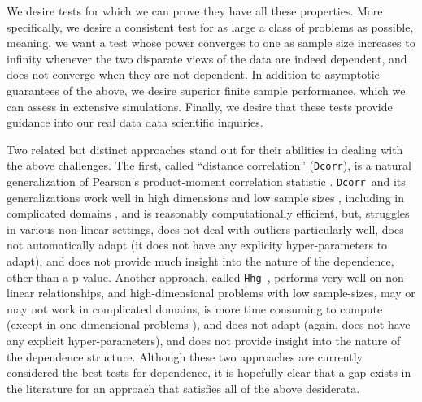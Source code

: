 \documentclass[11pt]{article}
\providecommand{\sct}[1]{{\sc \texttt{#1}}}
\newcommand{\Hhg}{\sct{Hhg}}
\newcommand{\Dcorr}{\sct{Dcorr}}
\begin{document}
We desire tests for which we can prove they have all these properties. More specifically, we desire a consistent test for as large a class of problems as possible, meaning, we want a test whose power converges to one as sample size increases to infinity whenever the two disparate views of the data are indeed dependent, and does not converge when they are not dependent. 
In addition to asymptotic guarantees of the above, we desire superior finite sample performance, which we can assess in extensive simulations.  Finally, we desire that these tests provide guidance into our real data data scientific inquiries.




Two related but distinct approaches stand out for their abilities in dealing with the above challenges. The first, called ``distance correlation'' (\Dcorr), is a natural generalization of Pearson's product-moment correlation statistic \cite{RizzoSzekely2016}.  \Dcorr~and its generalizations work well in high dimensions and low sample sizes \cite{??}, including in complicated domains \cite{Lyons2013}, and is reasonably computationally efficient, but, struggles in various non-linear settings, does not deal with outliers particularly well, does not automatically adapt (it does not have any explicity hyper-parameters to adapt), and does not provide much insight into the nature of the dependence, other than a p-value.  Another approach, called \Hhg~\cite{HellerGorfine2013}, performs very well on non-linear relationships, and high-dimensional problems with low sample-sizes, may or may not work in complicated domains, is more time consuming to compute (except in one-dimensional problems \cite{??}), and does not adapt (again, does not have any explicit hyper-parameters), and does not provide insight into the nature of the dependence structure.  Although these two approaches are currently considered the best tests for dependence, it is hopefully clear that a gap exists in the literature for an approach that satisfies all of the above desiderata. 
\end{document}
